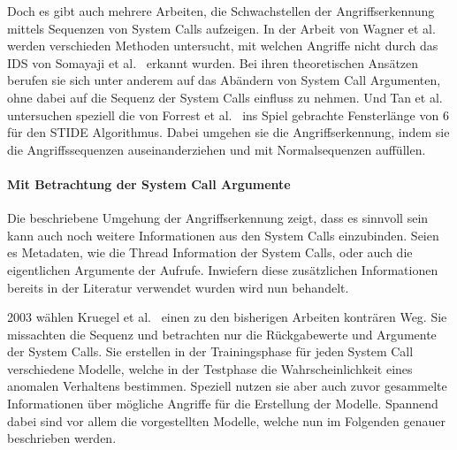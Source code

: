             Doch es gibt auch mehrere Arbeiten, die Schwachstellen der Angriffserkennung mittels Sequenzen von System Calls aufzeigen.
            In der Arbeit von Wagner et al.~\cite{Syscallseqexploit1} werden verschieden Methoden untersucht, mit welchen Angriffe nicht durch das IDS von Somayaji et al.~\cite{FORREST2000} erkannt wurden.
            Bei ihren theoretischen Ansätzen berufen sie sich unter anderem auf das Abändern von System Call Argumenten, ohne dabei auf die Sequenz der System Calls einfluss zu nehmen.
            UndTan et al.~\cite{Syscallseqexploit3} untersuchen speziell die von Forrest et al.~\cite{FORREST} ins Spiel gebrachte Fensterlänge von $6$ für den \ac{STIDE} Algorithmus.
            Dabei umgehen sie die Angriffserkennung, indem sie die Angriffssequenzen auseinanderziehen und mit Normalsequenzen auffüllen.


        \paragraph{Mit Betrachtung der System Call Argumente}\label{sec:related_sys_arg}
            Die beschriebene Umgehung der Angriffserkennung zeigt, dass es sinnvoll sein kann auch noch weitere Informationen aus den System Calls einzubinden.
            Seien es Metadaten, wie die Thread Information der System Calls, oder auch die eigentlichen Argumente der Aufrufe.
            Inwiefern diese zusätzlichen Informationen bereits in der Literatur verwendet wurden wird nun behandelt.\par\medskip

            2003 wählen Kruegel et al.~\cite{ARGUMENTS} einen zu den bisherigen Arbeiten konträren Weg.
            Sie missachten die Sequenz und betrachten nur die Rückgabewerte und Argumente der System Calls.
            Sie erstellen in der Trainingsphase für jeden System Call verschiedene Modelle, welche in der Testphase die Wahrscheinlichkeit eines anomalen Verhaltens bestimmen.
            Speziell nutzen sie aber auch zuvor gesammelte Informationen über mögliche Angriffe für die Erstellung der Modelle.
            Spannend dabei sind vor allem die vorgestellten Modelle, welche nun im Folgenden genauer beschrieben werden.\par\medskip

